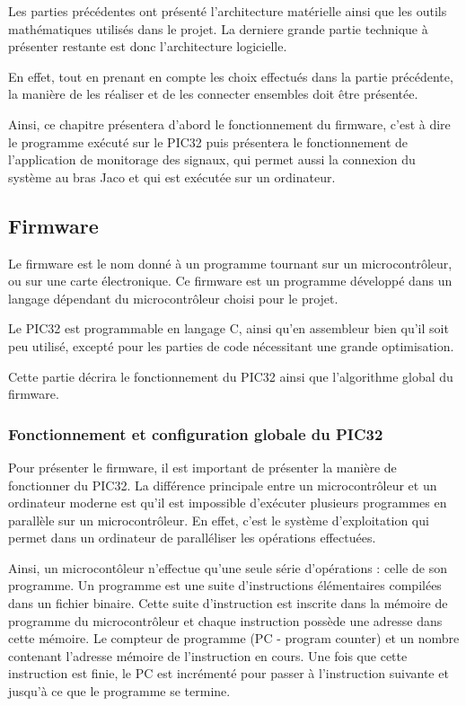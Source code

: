 \documentclass[letterpaper, twoside, 12pt, memoire, creativecommons, hyperref]{thETS}
\begin{document}
Les parties précédentes ont présenté l'architecture matérielle ainsi que les outils mathématiques utilisés dans le projet. La derniere grande partie technique à présenter restante est donc l'architecture logicielle. 

En effet, tout en prenant en compte les choix effectués dans la partie précédente, la manière de les réaliser et de les connecter ensembles doit être présentée. 

Ainsi, ce chapitre présentera d'abord le fonctionnement du firmware, c'est à dire le programme exécuté sur le PIC32 puis présentera le fonctionnement de l'application de monitorage des signaux, qui permet aussi la connexion du système au bras Jaco et qui est exécutée sur un ordinateur. 

\subsection{Firmware}

Le firmware est le nom donné à un programme tournant sur un microcontrôleur, ou sur une carte électronique. Ce firmware est un programme développé dans un langage dépendant du microcontrôleur choisi pour le projet. 

Le PIC32 est programmable en langage C, ainsi qu'en assembleur bien qu'il soit peu utilisé, excepté pour les parties de code nécessitant une grande optimisation. 

Cette partie décrira le fonctionnement du PIC32 ainsi que l'algorithme global du firmware. 

\subsubsection{Fonctionnement et configuration globale du PIC32}

Pour présenter le firmware, il est important de présenter la manière de fonctionner du PIC32. La différence principale entre un microcontrôleur et un ordinateur moderne est qu'il est impossible d'exécuter plusieurs programmes en parallèle sur un microcontrôleur. En effet, c'est le système d'exploitation qui permet dans un ordinateur de paralléliser les opérations effectuées. 

Ainsi, un microcontôleur n'effectue qu'une seule série d'opérations : celle de son programme. Un programme est une suite d'instructions élémentaires compilées dans un fichier binaire. Cette suite d'instruction est inscrite dans la mémoire de programme du microcontrôleur et chaque instruction possède une adresse dans cette mémoire. Le compteur de programme (PC - program counter) et un nombre contenant l'adresse mémoire de l'instruction en cours. Une fois que cette instruction est finie, le PC est incrémenté pour passer à l'instruction suivante et jusqu'à ce que le programme se termine. 
\end{document}
